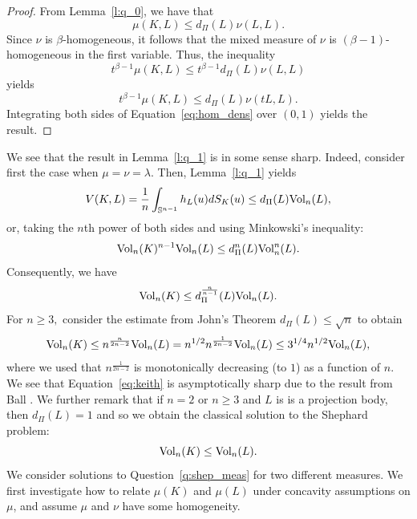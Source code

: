 \documentclass[11pt]{amsart}
\theoremstyle{definition}
\theoremstyle{remark}
\numberwithin{equation}{section}
\newcommand{\s}{\mathbb{S}}
\newcommand{\vol}{\text{\rm Vol}}
\begin{document}
\begin{proof}
From Lemma~\ref{l:q_0}, we have that
$$
  \mu(K,L) \leq d_{\Pi}(L)\nu(L,L).
$$
Since $\nu$ is $\beta$-homogeneous, it follows that the mixed measure of $\nu$ is $(\beta-1)$-homogeneous in the first variable. Thus, the inequality
$$
 t^{\beta-1}\mu(K,L) \leq  t^{\beta-1}d_{\Pi}(L)\nu(L,L)
$$
yields 
\begin{equation}
   t^{\beta-1}\mu(K,L) \leq d_{\Pi}(L)\nu(tL,L).
     \label{eq:hom_dens}
\end{equation}
Integrating both sides of Equation~\ref{eq:hom_dens} over $(0,1)$ yields the result.
\end{proof}
We see that the result in Lemma~\ref{l:q_1} is in some sense sharp. Indeed, consider first the case when $\mu=\nu=\lambda$. Then, Lemma~\ref{l:q_1} yields
$$V(K,L)=\frac{1}{n}\int_{\s^{n-1}}h_L(u) dS_K(u) \leq d_{\Pi}(L) \vol_n(L),$$
or, taking the $n$th power of both sides and using Minkowski's inequality:
$$\vol_n(K)^{n-1}\vol_n(L)\leq d^n_{\Pi}(L) \vol^n_n(L).$$
Consequently, we have
$$\vol_n(K)\leq d^{\frac{n}{n-1}}_{\Pi}(L) \vol_n(L).$$
For $n\geq 3,$ consider the estimate from John's Theorem $d_{\Pi}(L)\leq \sqrt{n}$ to obtain
\begin{equation}
\label{eq:keith}
\vol_n(K)\leq n^{\frac{n}{2n-2}} \vol_n(L)=n^{1/2}n^{\frac{1}{2n-2}}\vol_n(L)\leq 3^{1/4}n^{1/2}\vol_n(L),\end{equation}
where we used that $n^{\frac{1}{2n-2}}$ is monotonically decreasing (to $1$) as a function of $n.$ We see that Equation~\ref{eq:keith} is asymptotically sharp due to the result from Ball \cite{Ball91_0}.
We further remark that if $n=2$ or $n\geq 3$ and $L$ is is a projection body, then $d_{\Pi}(L)=1$ and so we obtain the classical solution to the Shephard problem:
$$\vol_n(K)\leq \vol_n(L).$$
We consider solutions to Question~\ref{q:shep_meas} for two different measures. We first investigate how to relate $\mu(K)$ and $\mu(L)$ under concavity assumptions on $\mu$, and assume $\mu$ and $\nu$ have some homogeneity.
\end{document}
